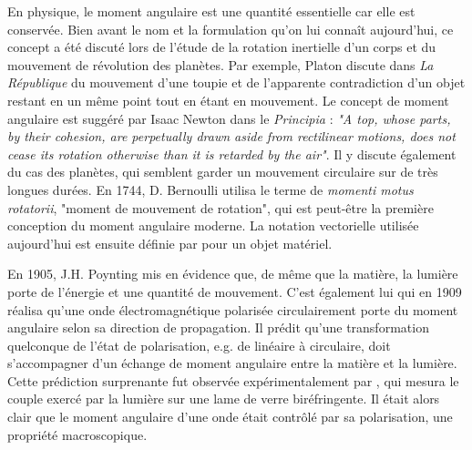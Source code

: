 En physique, le moment angulaire est une quantité essentielle car elle est conservée. Bien avant le nom et la formulation qu'on lui connaît aujourd'hui, ce concept a été discuté lors de l'étude de la rotation inertielle d'un corps et du mouvement de révolution des planètes. Par exemple, Platon discute dans \textit{La République} du mouvement d'une toupie et de l'apparente contradiction d'un objet restant en un même point tout en étant en mouvement. Le concept de moment angulaire est suggéré par Isaac Newton dans le \textit{Principia} : \textit{"A top, whose parts, by their cohesion, are perpetually drawn aside from rectilinear motions, does not cease its rotation otherwise than it is retarded by the air"}. Il y discute également du cas des planètes, qui semblent garder un mouvement circulaire sur de très longues durées. En 1744, D. Bernoulli utilisa le terme de \textit{momenti motus rotatorii}, "moment de mouvement de rotation", qui est peut-être la première conception du moment angulaire moderne. La notation vectorielle utilisée aujourd'hui est ensuite définie par  pour un objet matériel.

En 1905, J.H. Poynting mis en évidence que, de même que la matière, la lumière porte de l'énergie et une quantité de mouvement. C'est également lui qui en 1909 réalisa qu'une onde électromagnétique polarisée circulairement porte du moment angulaire selon sa direction de propagation. Il prédit qu'une transformation quelconque de l'état de polarisation, e.g. de linéaire à circulaire, doit s'accompagner d'un échange de moment angulaire entre la matière et la lumière. Cette prédiction surprenante fut observée expérimentalement par , qui mesura le couple exercé par la lumière sur une lame de verre biréfringente. Il était alors clair que le moment angulaire d'une onde était contrôlé par sa polarisation, une propriété macroscopique. %

